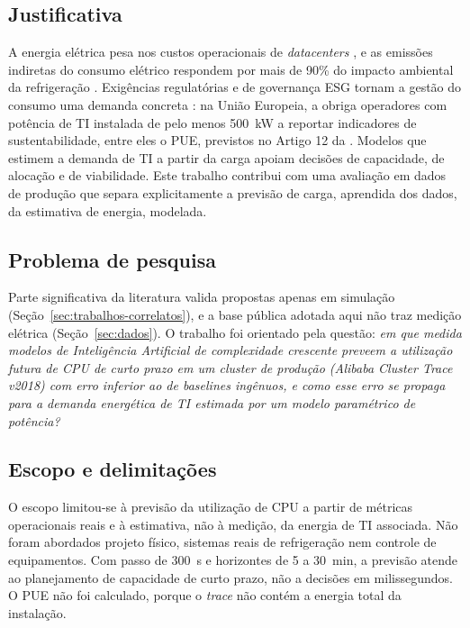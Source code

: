 \documentclass[a4paper,12pt]{article}
\begin{document}
\subsection{Justificativa}

A energia elétrica pesa nos custos operacionais de \textit{datacenters} \cite{gao2014}, e as emissões indiretas do consumo elétrico respondem por mais de 90\% do impacto ambiental da refrigeração \cite{erkek2026}. Exigências regulatórias e de governança ESG tornam a gestão do consumo uma demanda concreta \cite{zatonatska2024comprehensive}: na União Europeia, a  obriga operadores com potência de TI instalada de pelo menos 500~kW a reportar indicadores de sustentabilidade, entre eles o PUE, previstos no Artigo 12 da . Modelos que estimem a demanda de TI a partir da carga apoiam decisões de capacidade, de alocação e de viabilidade. Este trabalho contribui com uma avaliação em dados de produção que separa explicitamente a previsão de carga, aprendida dos dados, da estimativa de energia, modelada.

\subsection{Problema de pesquisa}

Parte significativa da literatura valida propostas apenas em simulação \cite{kahil2025} (Seção~\ref{sec:trabalhos-correlatos}), e a base pública adotada aqui não traz medição elétrica (Seção~\ref{sec:dados}). O trabalho foi orientado pela questão: \textit{em que medida modelos de Inteligência Artificial de complexidade crescente preveem a utilização futura de CPU de curto prazo em um cluster de produção (Alibaba Cluster Trace v2018) com erro inferior ao de baselines ingênuos, e como esse erro se propaga para a demanda energética de TI estimada por um modelo paramétrico de potência?}

\subsection{Escopo e delimitações}

O escopo limitou-se à previsão da utilização de CPU a partir de métricas operacionais reais e à estimativa, não à medição, da energia de TI associada. Não foram abordados projeto físico, sistemas reais de refrigeração nem controle de equipamentos. Com passo de 300~s e horizontes de 5 a 30~min, a previsão atende ao planejamento de capacidade de curto prazo, não a decisões em milissegundos. O PUE não foi calculado, porque o \textit{trace} não contém a energia total da instalação.
\end{document}
